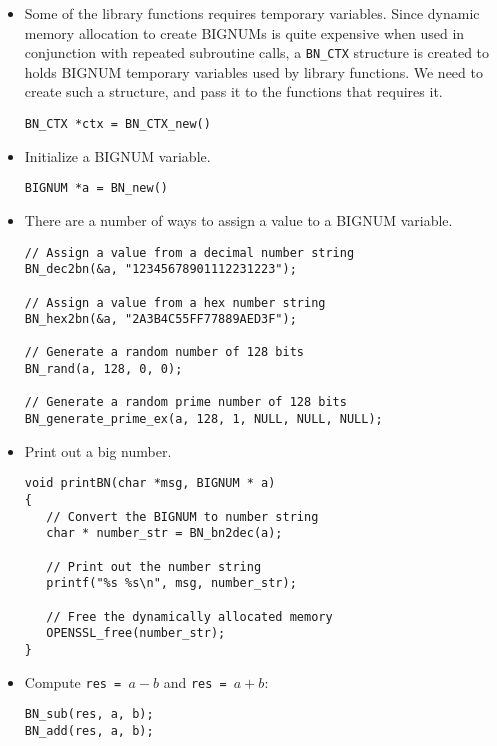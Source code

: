 \begin{itemize}

\item Some of the library functions requires temporary variables.
Since dynamic memory allocation to create BIGNUMs is quite expensive
when used in conjunction with repeated subroutine calls,
a \texttt{BN\_CTX} structure is created to holds BIGNUM temporary variables
used by library functions. We need to create such a structure, and pass
it to the functions that requires it.

\begin{lstlisting}
BN_CTX *ctx = BN_CTX_new()
\end{lstlisting}


\item Initialize a BIGNUM variable.

\begin{lstlisting}
BIGNUM *a = BN_new()
\end{lstlisting}


\item There are a number of ways to assign a value to a BIGNUM variable.


\begin{lstlisting}
// Assign a value from a decimal number string
BN_dec2bn(&a, "12345678901112231223");

// Assign a value from a hex number string
BN_hex2bn(&a, "2A3B4C55FF77889AED3F");

// Generate a random number of 128 bits
BN_rand(a, 128, 0, 0);

// Generate a random prime number of 128 bits
BN_generate_prime_ex(a, 128, 1, NULL, NULL, NULL);
\end{lstlisting}


\item Print out a big number.

\begin{lstlisting}
void printBN(char *msg, BIGNUM * a)
{
   // Convert the BIGNUM to number string
   char * number_str = BN_bn2dec(a);

   // Print out the number string
   printf("%s %s\n", msg, number_str);

   // Free the dynamically allocated memory
   OPENSSL_free(number_str);
}
\end{lstlisting}


\item Compute \texttt{res = $a - b$} and \texttt{res = $a + b$}:

\begin{lstlisting}
BN_sub(res, a, b);
BN_add(res, a, b);
\end{lstlisting}




\end{itemize}
